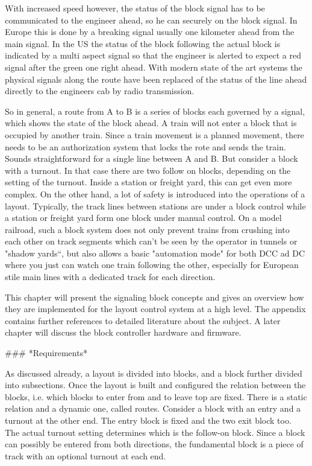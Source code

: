 With increased speed however, the status of the block signal has to be communicated to the engineer ahead, so he can  securely on the block signal. In Europe this is done by a breaking signal usually one kilometer ahead from the main signal. In the US the status of the block following the actual block is indicated by a multi aspect signal so that the engineer is alerted to expect a red signal after the green one right ahead. With modern state of the art systems the physical signals along the route have been replaced of the status of the line ahead directly to the engineers cab by radio transmission.

So in general, a route from A to B is a series of blocks each governed by a signal, which shows the state of the block ahead. A train will not enter a block that is occupied by another train. Since a train movement is a planned movement, there needs to be an authorization system that locks the rote and sends the train. Sounds straightforward for a single line between A and B. But consider a block with a turnout. In that case there are two follow on blocks, depending on the setting of the turnout. Inside a station or freight yard, this can get even more complex. On the other hand, a lot of safety is introduced into the operations of a layout. Typically, the track lines between stations are under a block control while a station or freight yard form one block under manual control. On a model railroad, such a block system does not only prevent trains from crushing into each other on track segments which can’t be seen by the operator in tunnels or "shadow yards“, but also allows a basic "automation mode" for both DCC ad DC where you just can watch one train following the other, especially for European stile main lines with a dedicated track for each direction.

This chapter will present the signaling block concepts and gives an overview how they are implemented for the layout control system at a high level. The appendix contains further references to detailed literature about the subject. A later chapter will discuss the block controller hardware and firmware.

### *Requirements*

As discussed already, a layout is divided into blocks, and a block further divided into subsections. Once the layout is built and configured the relation between the blocks, i.e. which blocks to enter from and to leave top are fixed. There is a static relation and a dynamic one, called routes. Consider a block with an entry and a turnout at the other end. The entry block is fixed and the two exit block too. The actual turnout setting determines which is the follow-on block. Since a block can possibly be entered from both directions, the fundamental block is a piece of track with an optional turnout at each end.

